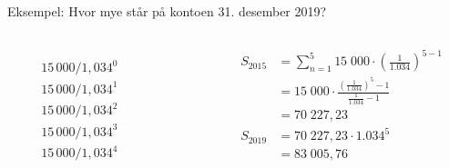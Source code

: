 \begin{frame}[t]{Eksempel: Hvor mye står på kontoen 31. desember 2019?}
\begin{center}
\end{center}
\begin{columns}[T,onlytextwidth]
  \begin{column}{0.10\textwidth}
    \begin{align*}
      &\\
      &\\
      &15\,000 / 1,034^0\\
      &15\,000 / 1,034^1\\
      &15\,000 / 1,034^2\\
      &15\,000 / 1,034^3\\
      &15\,000 / 1,034^4
    \end{align*}
  \end{column}
  \begin{column}{0.30\textwidth}
  \end{column}
   \begin{column}{0.60\textwidth}
   \begin{align*}
     S_{2015}&=\sum_{n=1}^5 15\;000\cdot \left(\frac{1}{1.034}\right)^{5-1}\\
             &=15\;000\cdot \frac{\left(\frac{1}{1.034}\right)^5-1}{\frac{1}{1.034}-1}\\
             &=70\;227,23\\
     S_{2019}&=70\;227,23\cdot 1.034^5\\
             &=83\;005,76
   \end{align*}
\end{column}
\end{columns}
\end{frame}

